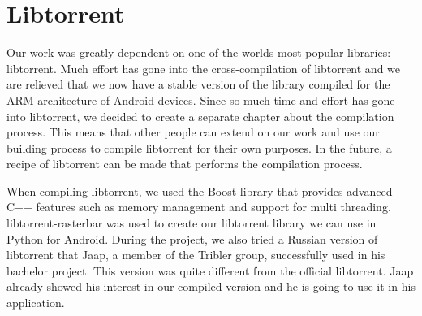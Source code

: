 \section{Libtorrent}
	Our work was greatly dependent on one of the worlds most popular libraries: libtorrent. Much effort has gone into the cross-compilation of libtorrent and we are relieved that we now have a stable version of the library compiled for the ARM architecture of Android devices. Since so much time and effort has gone into libtorrent, we decided to create a separate chapter about the compilation process. This means that other people can extend on our work and use our building process to compile libtorrent for their own purposes. In the future, a recipe of libtorrent can be made that performs the compilation process.
	
	When compiling libtorrent, we used the Boost library that provides advanced C++ features such as memory management and support for multi threading. libtorrent-rasterbar was used to create our libtorrent library we can use in Python for Android. During the project, we also tried a Russian version of libtorrent that Jaap, a member of the Tribler group, successfully used in his bachelor project. This version was quite different from the official libtorrent. Jaap already showed his interest in our compiled version and he is going to use it in his application.